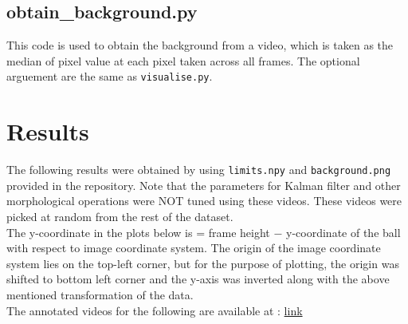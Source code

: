 \documentclass[12pt]{article}
\begin{document}
\subsection*{obtain\_background.py}
This code is used to obtain the background from a video, which is taken as the median of pixel value at each pixel taken across all frames. The optional arguement are the same as \verb|visualise.py|.

\section*{Results}
The following results were obtained by using \verb|limits.npy| and \verb|background.png| provided in the repository. Note that the parameters for Kalman filter and other morphological operations were NOT tuned using these videos. These videos were picked at random from the rest of the dataset.\\
The y-coordinate in the plots below is = frame height $-$ y-coordinate of the ball with respect to image coordinate system. The origin of the image coordinate system lies on the top-left corner, but for the purpose of plotting, the origin was shifted to bottom left corner and the y-axis was inverted along with the above mentioned transformation of the data.\\
The annotated videos for the following are available at : \href{https://drive.google.com/drive/folders/1XGLOxgiLd4pXo52SBLYhWAA1uuqHfmDX?usp=sharing}{link}
\end{document}
